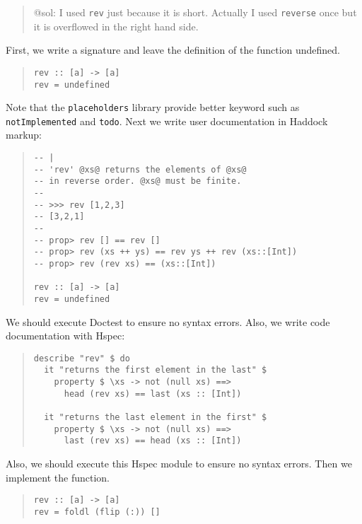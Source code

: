 \documentclass[preprint]{sigplanconf}
\begin{document}
\begin{quote}
@sol: I used \verb|rev| just because it is short.
Actually I used \verb|reverse| once but it is overflowed
in the right hand side.
\end{quote}

First, we write a signature and leave the definition of the function undefined.

\begin{quote}
\small
\begin{verbatim}
rev :: [a] -> [a]
rev = undefined
\end{verbatim}
\end{quote}

\noindent Note that the {\tt placeholders} library provide better keyword such as {\tt notImplemented} and {\tt todo}.
Next we write user documentation in Haddock markup:

\begin{quote}
\small
\begin{verbatim}
-- |
-- 'rev' @xs@ returns the elements of @xs@
-- in reverse order. @xs@ must be finite.
--
-- >>> rev [1,2,3]
-- [3,2,1]
--
-- prop> rev [] == rev []
-- prop> rev (xs ++ ys) == rev ys ++ rev (xs::[Int])
-- prop> rev (rev xs) == (xs::[Int])

rev :: [a] -> [a]
rev = undefined
\end{verbatim}
\end{quote}

\noindent We should execute Doctest to ensure no syntax errors.
Also, we write code documentation with Hspec:

\begin{quote}
\small
\begin{verbatim}
describe "rev" $ do
  it "returns the first element in the last" $
    property $ \xs -> not (null xs) ==>
      head (rev xs) == last (xs :: [Int])

  it "returns the last element in the first" $
    property $ \xs -> not (null xs) ==>
      last (rev xs) == head (xs :: [Int])
\end{verbatim}
\end{quote}

\noindent Also, we should execute this Hspec module
to ensure no syntax errors.
Then we implement the function.

\begin{quote}
\small
\begin{verbatim}
rev :: [a] -> [a]
rev = foldl (flip (:)) []
\end{verbatim}
\end{quote}
\end{document}

